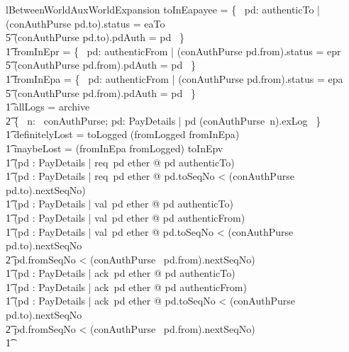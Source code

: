 \begin{LNewLemma}
\begin{zeves-theorem}{lBetweenWorldAuxWorldExpansion}
            toInEapayee = \{~ pd: authenticTo | (conAuthPurse pd.to).status = eaTo \\
                    \t5 \land (conAuthPurse pd.to).pdAuth = pd ~\} \land \\ \t1
            fromInEpr = \{~ pd: authenticFrom | (conAuthPurse pd.from).status = epr \\
                    \t5 \land (conAuthPurse pd.from).pdAuth = pd ~\} \land \\ \t1
            fromInEpa = \{~ pd: authenticFrom | (conAuthPurse pd.from).status = epa \\
                    \t5 \land (conAuthPurse pd.from).pdAuth = pd ~\} \land \\ \t1
            allLogs = archive \cup \\
                \t2 \{~ n: \dom~conAuthPurse; pd: PayDetails | pd \in (conAuthPurse~n).exLog ~\} \land \\ \t1
            definitelyLost = toLogged \cap (fromLogged \cup fromInEpa) \land \\ \t1
            maybeLost = (fromInEpa \cup fromLogged) \cap toInEpv \land \\
    \t1
            (\forall pd : PayDetails | req~pd \in ether @ pd \in authenticTo)
            \land \\ \t1
            (\forall pd : PayDetails | req~pd \in ether @
                 pd.toSeqNo < (conAuthPurse~ pd.to).nextSeqNo) \\ \t1
            \land
            (\forall pd : PayDetails | val~pd \in ether @ pd \in authenticTo) \land \\ \t1
            (\forall pd : PayDetails | val~pd \in ether @ pd \in authenticFrom) \land \\ \t1
            (\forall pd : PayDetails | val~pd \in ether @ pd.toSeqNo < (conAuthPurse~ pd.to).nextSeqNo \\
                \t2 \land pd.fromSeqNo < (conAuthPurse~ pd.from).nextSeqNo) \land \\ \t1
            (\forall pd : PayDetails | ack~pd \in ether @ pd \in authenticTo)\land  \\ \t1
            (\forall pd : PayDetails | ack~pd \in ether @ pd \in authenticFrom) \land \\ \t1
            (\forall pd : PayDetails | ack~pd \in ether @ pd.toSeqNo < (conAuthPurse~ pd.to).nextSeqNo  \\ %
                \t2 \land pd.fromSeqNo < (conAuthPurse~ pd.from).nextSeqNo) \land \\ \t1

\end{zeves-theorem}
\end{LNewLemma}
